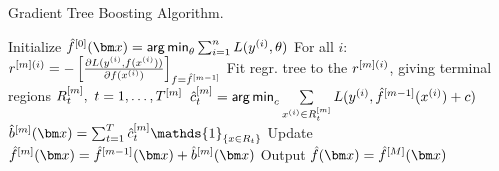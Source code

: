 \begin{algorithm}[H]
  \begin{footnotesize}
  \begin{center}
  \caption{Gradient Tree Boosting Algorithm.}
    \begin{algorithmic}[1]
      \State Initialize $\hat{f}^{[0]}(\xv) = \argmin_{\theta} \sumin L(\yi, \theta)$
          \State For all $i$: $r^{[m](i)} = -\left[\frac{\partial{L(y^{(i)}, f(x^{(i)}))}}{\partial f(x^{(i)})}\right]_{f=\hat{f}^{[m-1]}}$
          \State Fit regr. tree to the $r^{[m](i)}$, giving terminal regions $R_{t}^{[m]},
          \ t = 1,\ldots,T^{[m]}$
          \State $\hat{c}_t^{[m]} = \mathop{\sf arg\,min}_{c} \sum \limits_{x^{(i)} \in R_{t}^{[m]}} L(y^{(i)}, \hat{f}^{[m-1]}(x^{(i)}) + c)$
        \EndFor
        \State $\bmmh(\xv) = \sum_{t=1}^{T} \ctmh \mathds{1}_{\{x \in R_t\}} $
        \State Update $\fmh(\xv) = \fmdh(\xv) + \bmmh(\xv)$
      \EndFor
      \State Output $\hat{f}(\xv) = \hat{f}^{[M]}(\xv)$
    \end{algorithmic}
    \end{center}
    \end{footnotesize}
\end{algorithm}
